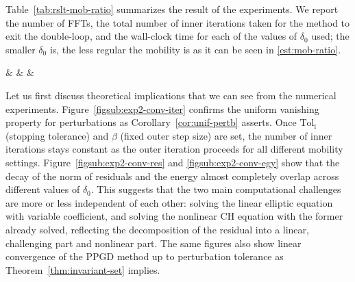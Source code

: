 \documentclass{amsart}
\newcommand{\s}{{\beta}}	%
\theoremstyle{definition}
\begin{document}
Table~\ref{tab:rslt-mob-ratio} summarizes the result of the experiments. We report the number of FFTs, the total number of inner iterations taken for the method to exit the double-loop, and the wall-clock time for each of the values of $\delta_0$ used; the smaller $\delta_0$ is, the less regular the mobility is as it can be seen in \eqref{est:mob-ratio}.  
\begin{table}[]
	\centering
	{ \tablenum[%
		round-precision=3,
		round-mode=places
		]{\delnaught} & 
		\tablenum[round-precision=0, round-mode=places]{\FFT} & 
		\tablenum[round-precision=0, round-mode=places]{\iter} & 
		\tablenum[round-precision=3, round-mode=places]{\time}
	}
	\caption{Computational cost depending on the mobility ratio (Section~\ref{sec:num-exp2-Mob}). The smaller $\delta_0$ is, the less regular the mobility is as can be seen in \eqref{est:mob-ratio}.}
	\label{tab:rslt-mob-ratio}
\end{table}

Let us first discuss theoretical implications that we can see from the numerical experiments.  
Figure~\ref{figsub:exp2-conv-iter} confirms the uniform vanishing  property for perturbations as Corollary~\ref{cor:unif-pertb} asserts. Once $\mathrm{Tol}_{\mathrm{i}}$ (stopping tolerance) and $\s$ (fixed outer step size) are set, the number of inner iterations stays constant as the outer iteration proceeds for all different mobility settings. 
Figure~\ref{figsub:exp2-conv-res} and \ref{figsub:exp2-conv-egy} show that the decay of the norm of residuals and the energy almost completely overlap across different values of $\delta_0$. This suggests that the two main computational challenges are more or less independent of each other: solving the linear elliptic equation with variable coefficient, and solving the nonlinear CH equation with the former already solved, reflecting the decomposition of the residual into a linear, challenging part and nonlinear part.
The same figures also show linear convergence of the PPGD method up to perturbation tolerance as Theorem~\ref{thm:invariant-set} implies.
\end{document}
